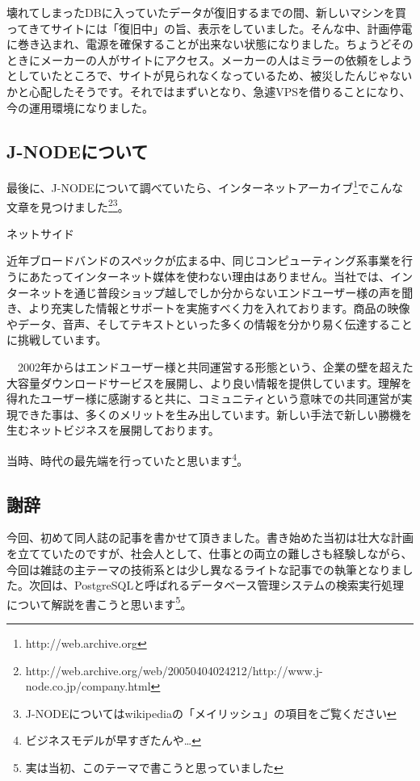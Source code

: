 壊れてしまったDBに入っていたデータが復旧するまでの間、新しいマシンを買ってきてサイトには「復旧中」の旨、表示をしていました。そんな中、計画停電に巻き込まれ、電源を確保することが出来ない状態になりました。ちょうどそのときにメーカーの人がサイトにアクセス。メーカーの人はミラーの依頼をしようとしていたところで、サイトが見られなくなっているため、被災したんじゃないかと心配したそうです。それではまずいとなり、急遽VPSを借りることになり、今の運用環境になりました。



\subsection{J-NODEについて}

最後に、J-NODEについて調べていたら、インターネットアーカイブ\footnote{http://web.archive.org}でこんな文章を見つけました\footnote{http://web.archive.org/web/20050404024212/http://www.j-node.co.jp/company.html}\footnote{J-NODEについてはwikipediaの「メイリッシュ」の項目をご覧ください}。

\begin{screen}
ネットサイド

近年ブロードバンドのスペックが広まる中、同じコンピューティング系事業を行うにあたってインターネット媒体を使わない理由はありません。当社では、インターネットを通じ普段ショップ越しでしか分からないエンドユーザー様の声を聞き、より充実した情報とサポートを実施すべく力を入れております。商品の映像やデータ、音声、そしてテキストといった多くの情報を分かり易く伝達することに挑戦しています。

　2002年からはエンドユーザー様と共同運営する形態という、企業の壁を超えた大容量ダウンロードサービスを展開し、より良い情報を提供しています。理解を得れたユーザー様に感謝すると共に、コミュニティという意味での共同運営が実現できた事は、多くのメリットを生み出しています。新しい手法で新しい勝機を生むネットビジネスを展開しております。

\end{screen}

当時、時代の最先端を行っていたと思います\footnote{ビジネスモデルが早すぎたんや…}。

\subsection{謝辞}
今回、初めて同人誌の記事を書かせて頂きました。書き始めた当初は壮大な計画を立てていたのですが、社会人として、仕事との両立の難しさも経験しながら、今回は雑誌の主テーマの技術系とは少し異なるライトな記事での執筆となりました。次回は、PostgreSQLと呼ばれるデータベース管理システムの検索実行処理について解説を書こうと思います\footnote{実は当初、このテーマで書こうと思っていました}。

